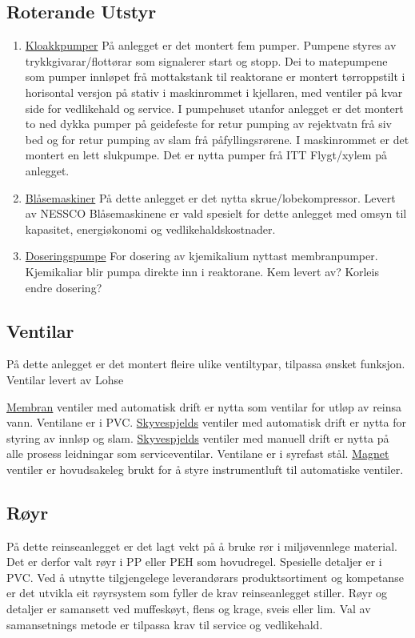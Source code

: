 \subsection{Roterande Utstyr}
\begin{enumerate}
    \item \underline{Kloakkpumper} \newline
    På anlegget er det  montert fem pumper. Pumpene styres av trykkgivarar/flottørar som signalerer start og stopp. 
    Dei to matepumpene som pumper innløpet frå mottakstank til reaktorane er montert tørroppstilt i horisontal versjon på stativ i maskinrommet i kjellaren, med ventiler på kvar side for vedlikehald og service.
    I pumpehuset utanfor anlegget er det montert to ned dykka pumper på geidefeste for retur pumping av rejektvatn frå siv bed og for retur pumping av slam frå påfyllingsrørene.
    I maskinrommet er det montert en lett slukpumpe. 
    Det er nytta pumper frå ITT Flygt/xylem på anlegget.   
    \item \underline{Blåsemaskiner} \newline
    På dette anlegget er det nytta skrue/lobekompressor. Levert av NESSCO
    Blåsemaskinene er vald spesielt for dette anlegget med omsyn til kapasitet, energiøkonomi og vedlikehaldskostnader.
    \item \underline{Doseringspumpe} \newline
    For dosering av kjemikalium nyttast membranpumper. Kjemikaliar blir pumpa direkte inn i reaktorane.
    Kem levert av?
    Korleis endre dosering?
\end{enumerate}

\subsection{Ventilar}
På dette anlegget er det montert fleire ulike ventiltypar, tilpassa ønsket funksjon. Ventilar levert av Lohse

\underline{Membran} ventiler med automatisk drift er nytta som ventilar for utløp av reinsa vann. Ventilane er i PVC.
\newline \underline{Skyvespjelds} ventiler med automatisk drift er nytta for styring av innløp og slam. 
\newline \underline{Skyvespjelds} ventiler med manuell drift er nytta på alle prosess leidningar som serviceventilar. Ventilane er i syrefast stål. 
\newline \underline{Magnet} ventiler er hovudsakeleg brukt for å styre instrumentluft til automatiske ventiler.

\subsection{Røyr}
På dette reinseanlegget er det lagt vekt på å bruke rør i miljøvennlege material.  Det er derfor valt røyr i PP eller PEH som hovudregel.  Spesielle detaljer er i PVC.
Ved å utnytte tilgjengelege leverandørars produktsortiment og kompetanse er det utvikla eit røyrsystem som fyller de krav reinseanlegget stiller. 
Røyr og detaljer er samansett ved muffeskøyt, flens og krage, sveis eller lim.  Val av samansetnings metode er tilpassa krav til service og vedlikehald.